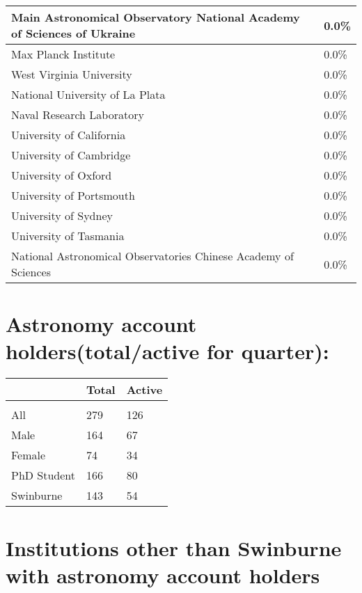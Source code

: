 \documentclass{article}%
\begin{document}
\begin{longtabu}{X[l] X[r]}
\hline%
Main Astronomical Observatory National Academy of Sciences of Ukraine&0.0\%\\%
\hline%
Max Planck Institute&0.0\%\\%
\hline%
West Virginia University&0.0\%\\%
\hline%
National University of La Plata&0.0\%\\%
\hline%
Naval Research Laboratory&0.0\%\\%
\hline%
University of California&0.0\%\\%
\hline%
University of Cambridge&0.0\%\\%
\hline%
University of Oxford&0.0\%\\%
\hline%
University of Portsmouth&0.0\%\\%
\hline%
University of Sydney&0.0\%\\%
\hline%
University of Tasmania&0.0\%\\%
\hline%
National Astronomical Observatories Chinese Academy of Sciences&0.0\%\\%
\hline%
\end{longtabu}%
\section{Astronomy account holders(total/active for quarter): }%

%
\begin{longtabu}{X[l] X[r] X[r]}%
\textbf{}&\textbf{Total}&\textbf{Active}\\%
\hline%
&&\\%
All&279&126\\%
\hline%
Male&164&67\\%
\hline%
Female&74&34\\%
\hline%
PhD Student&166&80\\%
\hline%
Swinburne&143&54\\%
\hline%
\end{longtabu}%
\section{Institutions other than Swinburne with astronomy account holders}%
\end{document}
